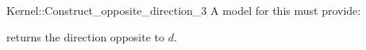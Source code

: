 \begin{ccRefFunctionObjectConcept}{Kernel::Construct_opposite_direction_3}
A model for this must provide:


 {returns the direction opposite to $d$.}

\ccIsModel{}

\end{ccRefFunctionObjectConcept}
